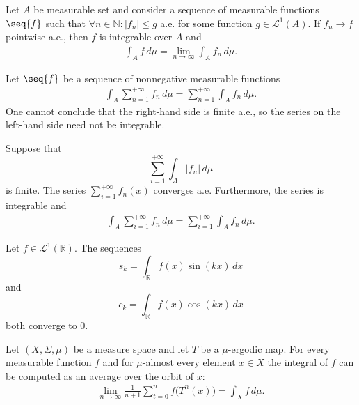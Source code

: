     \begin{theorem}\label{lebesgue:dominated_convergence_theorem}
        Let $A$ be measurable set and consider a sequence of measurable functions $\seq{f}$ such that $\forall n\in\mathbb{N}:|f_n|\leq g$ a.e. for some function $g\in\mathcal{L}^1(A)$. If $f_n\rightarrow f$ pointwise a.e., then $f$ is integrable over $A$ and
        \begin{gather}
            \int_Af\,d\mu = \lim_{n\rightarrow\infty}\int_Af_n\,d\mu.
        \end{gather}
    \end{theorem}

    \begin{property}
        Let $\seq{f}$ be a sequence of nonnegative measurable functions
        \begin{gather}
            \int_A\sum_{n=1}^{+\infty}f_n\,d\mu = \sum_{n=1}^{+\infty}\int_Af_n\,d\mu.
        \end{gather}
        One cannot conclude that the right-hand side is finite a.e., so the series on the left-hand side need not be integrable.
    \end{property}

    \begin{theorem}\label{lebesgue:beppo_levi}
        Suppose that \[\sum_{i=1}^{+\infty}\int_A|f_n|\,d\mu\] is finite. The series $\sum_{i=1}^{+\infty}f_n(x)$ converges a.e. Furthermore, the series is integrable and
        \begin{gather}
            \int_A\sum_{i=1}^{+\infty}f_n\,d\mu = \sum_{i=1}^{+\infty}\int_Af_n\,d\mu.
        \end{gather}
    \end{theorem}

    \begin{theorem}\label{lebesgue:riemann_lebesue_lemma}
        Let $f\in\mathcal{L}^1(\mathbb{R})$. The sequences \[s_k=\int_\mathbb{R}f(x)\sin(kx)\,dx\] and \[c_k=\int_\mathbb{R}f(x)\cos(kx)\,dx\] both converge to 0.
    \end{theorem}

    \begin{theorem}\label{lebesgue:ergodic}
        Let $(X,\Sigma,\mu)$ be a measure space and let $T$ be a $\mu$-ergodic map. For every measurable function $f$ and for $\mu$-almost every element $x\in X$ the integral of $f$ can be computed as an average over the orbit of $x$:
        \begin{gather}
            \lim_{n\rightarrow\infty}\frac{1}{n+1}\sum_{t=0}^nf\big(T^n(x)\big) = \int_Xf\,d\mu.
        \end{gather}
    \end{theorem}

